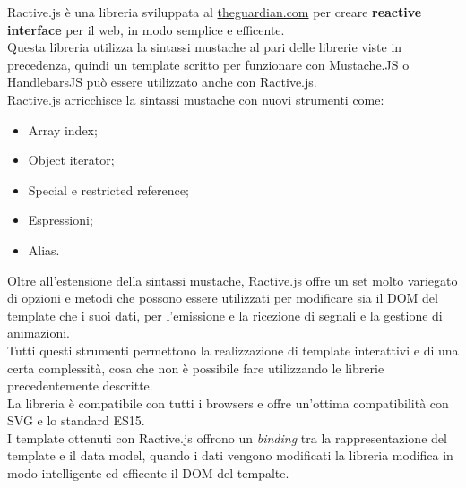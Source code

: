 Ractive.js è una libreria sviluppata al \href{https://www.theguardian.com}{theguardian.com} per creare \textbf{reactive interface} per il web, in modo semplice e efficente.\\
Questa libreria utilizza la sintassi mustache al pari delle librerie viste in precedenza, quindi un template scritto per funzionare con Mustache.JS o HandlebarsJS può essere utilizzato anche con Ractive.js.\\
Ractive.js arricchisce la sintassi mustache con nuovi strumenti come:
\begin{itemize}
	\item Array index;
	\item Object iterator;
	\item Special e restricted reference;
	\item Espressioni;
	\item Alias.
\end{itemize}
Oltre all'estensione della sintassi mustache, Ractive.js offre un set molto variegato di opzioni e metodi che possono essere utilizzati per modificare sia il DOM del template che i suoi dati,  per l'emissione e la ricezione di segnali e la gestione di animazioni.\\
Tutti questi strumenti permettono la realizzazione di template interattivi e di una certa complessità, cosa che non è possibile fare utilizzando le librerie precedentemente descritte.\\
La libreria è compatibile con tutti i browsers e offre un'ottima compatibilità con SVG e lo standard ES15.\\
I template ottenuti con Ractive.js  offrono un \textit{binding} tra la rappresentazione del template e  il data model, quando i dati vengono modificati la libreria modifica in modo intelligente ed efficente il DOM del tempalte.

